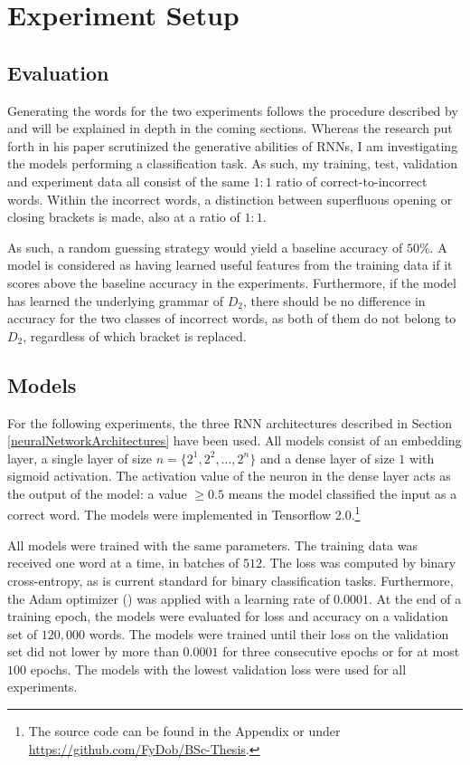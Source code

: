 \section{Experiment Setup}\label{ch:experimentSetup}
\subsection{Evaluation}\label{evaluation}
Generating the words for the two experiments follows the procedure described by \cite{Bernardy2018} and will be explained in depth in the coming sections. Whereas the research put forth in his paper scrutinized the generative abilities of RNNs, I am investigating the models performing a classification task. As such, my training, test, validation and experiment data all consist of the same $1{:}1$ ratio of correct-to-incorrect words. Within the incorrect words, a distinction between superfluous opening or closing brackets is made, also at a ratio of $1{:}1$.

As such, a random guessing strategy would yield a baseline accuracy of $50\%$. A model is considered as having learned useful features from the training data if it scores above the baseline accuracy in the experiments. Furthermore, if the model has learned the underlying grammar of $D_{2}$, there should be no difference in accuracy for the two classes of incorrect words, as both of them do not belong to $D_{2}$, regardless of which bracket is replaced.

\subsection{Models}\label{models}
For the following experiments, the three RNN architectures described in Section \ref{neuralNetworkArchitectures} have been used. All models consist of an embedding layer, a single layer of size $n = \lbrace 2^{1}, 2^{2}, \dots, 2^{n} \rbrace$ and a dense layer of size $1$ with sigmoid activation. The activation value of the neuron in the dense layer acts as the output of the model: a value $\geq 0.5$ means the model classified the input as a correct word. The models were implemented in Tensorflow 2.0.\footnote{The source code can be found in the Appendix or under \url {https://github.com/FyDob/BSc-Thesis}.}

All models were trained with the same parameters. The training data was received one word at a time, in batches of $512$. The loss was computed by binary cross-entropy, as is current standard for binary classification tasks. Furthermore, the Adam optimizer (\cite{Kingma2014}) was applied with a learning rate of $0.0001$. At the end of a training epoch, the models were evaluated for loss and accuracy on a validation set of $120{,}000$ words. The models were trained until their loss on the validation set did not lower by more than $0.0001$ for three consecutive epochs or for at most $100$ epochs. The models with the lowest validation loss were used for all experiments.

